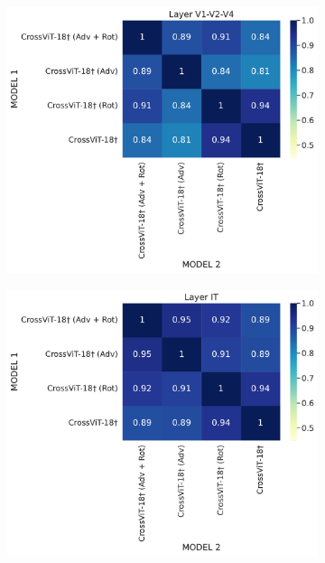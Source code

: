 \documentclass{article} %
\begin{document}
\begin{figure}[htb]
    \centering %
\begin{subfigure}{0.43\textwidth}
  \includegraphics[width=\linewidth]{src/cka/layer_V1-V2-V4.pdf}
\end{subfigure}\hfil %
\begin{subfigure}{0.43\textwidth}
  \includegraphics[width=\linewidth]{src/cka/layer_IT.pdf}


\end{subfigure}
\end{figure}
\end{document}

